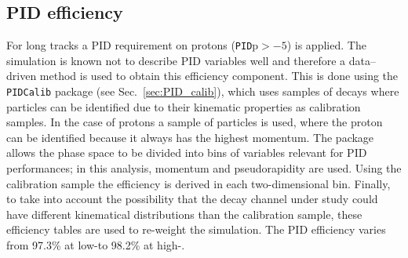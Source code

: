 \subsection{PID efficiency}
\label{sec:PIDeff}
For long tracks a PID requirement on protons (\verb!PID!p$ > -5$) is applied. The simulation is known not to
describe PID variables well and therefore a data--driven method is used to obtain this efficiency component.
This is done using the \verb!PIDCalib! package (see Sec.~\ref{sec:PID_calib}), which uses samples of
decays where particles can be identified due to their kinematic properties as calibration samples. In the case of protons 
a sample of \Lz particles is used, where the proton can be identified because it always has the highest momentum.
The package allows the phase space to be divided into bins of variables relevant for PID
performances; in this analysis, momentum and pseudorapidity are used.
Using the calibration sample the efficiency is derived in each two-dimensional bin.
Finally, to take into account the possibility that the decay channel under study could have different kinematical distributions
than the calibration sample, these efficiency tables are used to re-weight the simulation.
The PID efficiency varies from 97.3\% at low-\qsq to 98.2\% at high-\qsq. 
%



